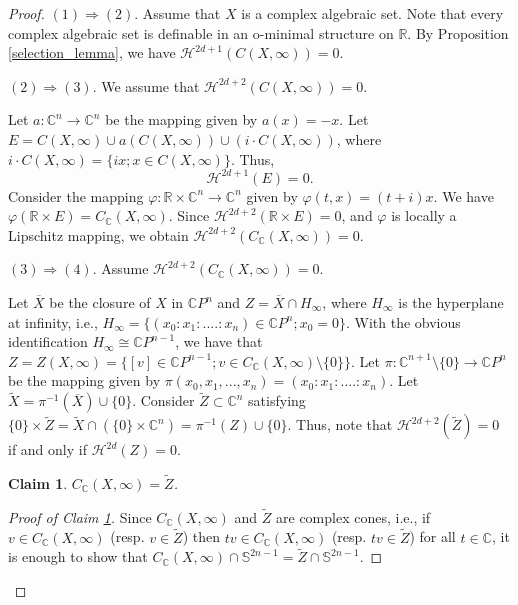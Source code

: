 \documentclass[a4paper,11pt]{amsart}
\newtheorem{claim}{Claim}[theorem]
\newcommand{\C}{\mathbb C}
\newcommand{\R}{\mathbb R}
\begin{document}
\begin{proof}
\noindent $(1) \Longrightarrow (2)$.
Assume that $X$ is a complex algebraic set. Note that every complex algebraic set is definable in an o-minimal structure on $\mathbb{R}$. By Proposition \ref{selection_lemma}, we have \(\mathcal{H}^{2d+1}(C(X,\infty))=0\).

\bigskip

\noindent $(2) \Longrightarrow (3)$.
We assume that $\mathcal{H}^{2d+2}(C(X,\infty))=0$.


Let $a\colon \C^n\to \C^n$ be the mapping given by $a(x)=-x$. Let $E=C(X,\infty)\cup a(C(X,\infty))\cup (i\cdot C(X,\infty))$, where $i\cdot C(X,\infty)=\{ix;x\in C(X,\infty)\}$. Thus,
$$
\mathcal{H}^{2d+1}(E)=0.
$$
Consider the mapping $\varphi\colon \R\times \C^n\to \C^n$ given by $\varphi(t,x)=(t+i)x$. We have $\varphi(\R\times E)=C_{\C}(X,\infty)$. Since $\mathcal{H}^{2d+2}(\R\times E)=0$, and $\varphi$ is locally a Lipschitz mapping, we obtain $\mathcal{H}^{2d+2}(C_{\C}(X,\infty))=0$.

\bigskip

\noindent $(3) \Longrightarrow (4)$. Assume $\mathcal{H}^{2d+2}(C_{\C}(X,\infty))=0$. 

Let $\overline{X}$ be the closure of $X$ in $\C P^n$ and $Z=\overline{X} \cap H_{\infty}$, where $H_{\infty}$ is the hyperplane at infinity, i.e., $H_{\infty}=\{(x_0:x_1:....:x_n)\in \C P^n; x_0=0\}$. With the obvious identification $H_{\infty}\cong \C P^{n-1}$, we have that $Z=Z(X,\infty)=\{[v]\in \mathbb{C}P^{n-1};v\in C_{\mathbb{C}}(X,\infty)\setminus\{0\}\}$.
Let $\pi\colon \C^{n+1}\setminus \{0\}\to \C P^n$ be the mapping given by $\pi(x_0,x_1,...,x_n)=(x_0:x_1:....:x_n)$.
Let $\widetilde{X}=\pi^{-1}(\overline{X})\cup \{0\}$. Consider $\widetilde{Z}\subset \C^n$ satisfying $\{0\}\times \widetilde{Z}=\widetilde{X}\cap (\{0\}\times \C^n)=\pi^{-1}(Z)\cup \{0\}$.
Thus, note that $\mathcal{H}^{2d+2}(\widetilde{Z})=0$ if and only if $\mathcal{H}^{2d}(Z)=0$.



\begin{claim}\label{algebraic_cone}
$C_{\C}(X,\infty)=\widetilde{Z}$.
\end{claim}
\begin{proof}[Proof of Claim \ref{algebraic_cone}]  
Since $C_{\C}(X,\infty)$ and $\widetilde{Z}$ are complex cones, i.e., if $v\in C_{\C}(X,\infty)$ (resp. $v\in \widetilde{Z}$) then $t v\in C_{\C}(X,\infty)$ (resp. $t v\in \widetilde{Z}$) for all $t\in \C$, it is enough to show that $C_{\C}(X,\infty)\cap \mathbb{S}^{2n-1}=\widetilde{Z}\cap \mathbb{S}^{2n-1}$.


\end{proof}
\end{proof}
\end{document}
